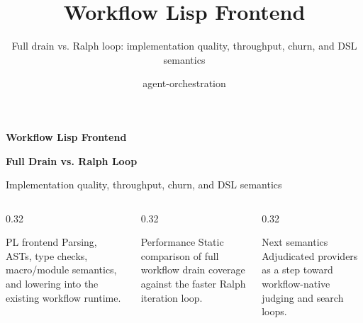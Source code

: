 \documentclass[aspectratio=169]{beamer}
\title{Workflow Lisp Frontend}
\subtitle{Full drain vs. Ralph loop: implementation quality, throughput, churn, and DSL semantics}
\author{agent-orchestration}
\date{}
\begin{document}
\begin{frame}[plain]
\vspace{0.35cm}
{\Large\color{aoBlue}\textbf{Workflow Lisp Frontend}\par}
\vspace{0.12cm}
{\huge\textbf{Full Drain vs. Ralph Loop}\par}
\vspace{0.2cm}
{\large Implementation quality, throughput, churn, and DSL semantics\par}
\vspace{0.55cm}
\begin{columns}[T,totalwidth=\textwidth]
\begin{column}{0.32\textwidth}
\begin{block}{PL frontend}
\footnotesize
Parsing, ASTs, type checks, macro/module semantics, and lowering into the existing workflow runtime.
\end{block}
\end{column}
\begin{column}{0.32\textwidth}
\begin{block}{Performance}
\footnotesize
Static comparison of full workflow drain coverage against the faster Ralph iteration loop.
\end{block}
\end{column}
\begin{column}{0.32\textwidth}
\begin{block}{Next semantics}
\footnotesize
Adjudicated providers as a step toward workflow-native judging and search loops.
\end{block}
\end{column}
\end{columns}
\end{frame}
\end{document}
